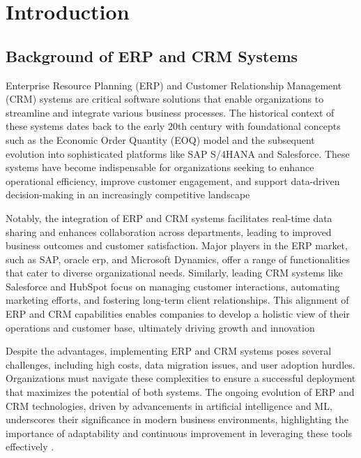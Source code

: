 



\chapter{Introduction}
\section{Background of ERP and CRM Systems} 

Enterprise Resource Planning (ERP) and Customer Relationship Management (CRM) systems are critical software solutions that enable organizations to streamline and integrate various business processes. The historical context of these systems dates back to the early 20th century with foundational concepts such as the Economic Order Quantity (EOQ) model and the subsequent evolution into sophisticated platforms like SAP S/4HANA and Salesforce. These systems have become indispensable for organizations seeking to enhance operational efficiency, improve customer engagement, and support data-driven decision-making in an increasingly competitive landscape \cite{oracle_erp,software_suggest_erp,softwareconnect} 

Notably, the integration of ERP and CRM systems facilitates real-time data sharing and enhances collaboration across departments, leading to improved business outcomes and customer satisfaction. Major players in the ERP market, such as SAP, oracle erp, and Microsoft Dynamics, offer a range of functionalities that cater to diverse organizational needs. Similarly, leading CRM systems like Salesforce and HubSpot focus on managing customer interactions, automating marketing efforts, and fostering long-term client relationships. This alignment of ERP and CRM capabilities enables companies to develop a holistic view of their operations and customer base, ultimately driving growth and innovation \cite{forbes_crm, vtiger_crm, medium_crm}

Despite the advantages, implementing ERP and CRM systems poses several challenges, including high costs, data migration issues, and user adoption hurdles. Organizations must navigate these complexities to ensure a successful deployment that maximizes the potential of both systems. The ongoing evolution of ERP and CRM technologies, driven by advancements in artificial intelligence and ML, underscores their significance in modern business environments, highlighting the importance of adaptability and continuous improvement in leveraging these tools effectively \cite{sap_features,oracle_erp,sap_s4hana}.

